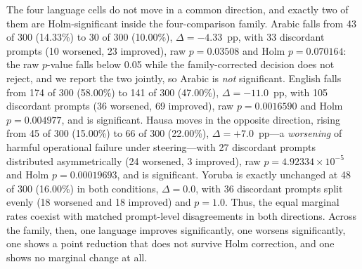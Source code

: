 The four language cells do not move in a common direction, and exactly two of
them are Holm-significant inside the four-comparison family. Arabic falls from
43 of 300 (14.33\%) to 30 of 300 (10.00\%), $\Delta = -4.33$~pp, with 33
discordant prompts (10 worsened, 23 improved), raw $p = 0.03508$ and Holm
$p = 0.070164$: the raw $p$-value falls below 0.05 while the family-corrected
decision does not reject, and we report the two jointly, so Arabic is
\emph{not} significant. English falls from 174 of 300 (58.00\%) to 141 of 300
(47.00\%), $\Delta = -11.0$~pp, with 105 discordant prompts (36 worsened, 69
improved), raw $p = 0.0016590$ and Holm $p = 0.004977$, and is significant.
Hausa moves in the opposite direction, rising from 45 of 300 (15.00\%) to 66 of
300 (22.00\%), $\Delta = +7.0$~pp---a \emph{worsening} of harmful operational
failure under steering---with 27 discordant prompts distributed asymmetrically
(24 worsened, 3 improved), raw $p = 4.92334\times10^{-5}$ and Holm
$p = 0.00019693$, and is significant. Yoruba is exactly unchanged at 48 of 300
(16.00\%) in both conditions, $\Delta = 0.0$, with 36 discordant prompts split
evenly (18 worsened and 18 improved) and $p = 1.0$. Thus, the equal marginal
rates coexist with matched prompt-level disagreements in both directions.
Across the family, then, one language improves significantly, one worsens
significantly, one shows a point reduction that does not survive Holm
correction, and one shows no marginal change at all.

